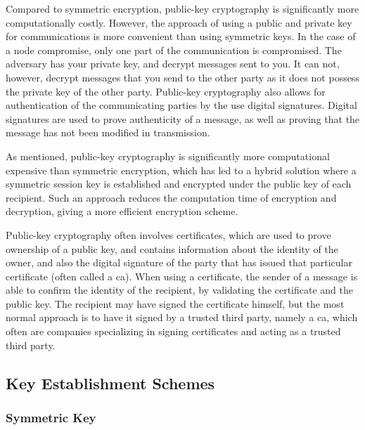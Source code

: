 Compared to symmetric encryption, public-key cryptography is significantly more computationally costly. However, the approach of using a public and private key for communications is more convenient than using symmetric keys. In the case of a node compromise, only one part of the communication is compromised. The adversary has your private key, and decrypt messages sent to you. It can not, however, decrypt messages that you send to the other party as it does not possess the private key of the other party. Public-key cryptography also allows for authentication of the communicating parties by the use digital signatures. Digital signatures are used to prove authenticity of a message, as well as proving that the message has not been modified in transmission.

As mentioned, public-key cryptography is significantly more computational expensive than symmetric encryption, which has led to a hybrid solution where a symmetric session key is established and encrypted under the public key of each recipient. Such an approach reduces the computation time of encryption and decryption, giving a more efficient encryption scheme.

Public-key cryptography often involves certificates, which are used to prove ownership of a public key, and contains information about the identity of the owner, and also the digital signature of the party that has issued that particular certificate (often called a \gls{ca}). When using a certificate, the sender of a message is able to confirm the identity of the recipient, by validating the certificate and the public key. The recipient may have signed the certificate himself, but the most normal approach is to have it signed by a trusted third party, namely a \gls{ca}, which often are companies specializing in signing certificates and acting as a trusted third party.

\subsection{Key Establishment Schemes}

\label{subsec:keys-schems}

\subsubsection{Symmetric Key}

